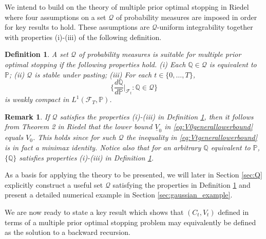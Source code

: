 \documentclass[11pt,a4paper]{article}
\newtheorem{definition}{Definition}
\newtheorem{remark}{Remark}
\renewcommand{\P}{\mathbb{P}}
\newcommand{\Q}{\mathbb{Q}}
\newcommand{\calF}{\mathcal{F}}
\newcommand{\calQ}{\mathcal{Q}}
\begin{document}
We intend to build on the theory of multiple prior optimal stopping in Riedel \cite{Riedel-09} where four assumptions on a set $\calQ$ of probability measures are imposed in order for key results to hold. These assumptions are $\calQ$-uniform integrability together with properties (i)-(iii) of the following definition. 

\begin{definition}\label{assumption}
A set $\calQ$ of probability measures is suitable for multiple prior optimal stopping if the following properties hold. 
(i) Each $\Q\in\calQ$ is equivalent to $\P$; 
(ii) $\calQ$ is stable under pasting; 
(iii) For each $t\in \{0,\dots,T\}$, 
$$
\bigg\{\frac{d\Q}{d\P}\bigg|_{\calF_t} : \Q\in\mathcal{Q}\bigg\}
$$
is weakly compact in $L^1(\calF_T,\P)$.
\end{definition}

\begin{remark}
If $\calQ$ satisfies the properties (i)-(iii) in Definition \ref{assumption}, then it follows from Theorem 2 in Riedel \cite{Riedel-09} that the lower bound $\underline{V}_0$ in \eqref{eq:V0generallowerbound} equals $V_0$. This holds since for such $\calQ$ the inequality in \eqref{eq:Vtgenerallowerbound} is in fact a minimax identity. 
Notice also that for an arbitrary $\Q$ equivalent to $\P$, $\{\Q\}$ satisfies properties (i)-(iii) in Definition \ref{assumption}. 
\end{remark}

As a basis for applying the theory to be presented, we will later in Section \ref{sec:Q} explicitly construct a useful set $\calQ$ satisfying the properties in Definition \ref{assumption} and present a detailed numerical example in Section \ref{sec:gaussian_example}. 

We are now ready to state a key result which shows that $(C_t,V_t)$ defined in terms of a multiple prior optimal stopping problem may equivalently be defined as the solution to a backward recursion.    
\end{document}
